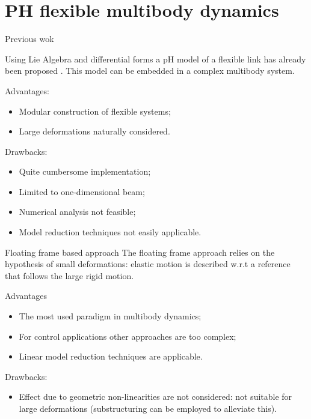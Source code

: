 \documentclass[aspectratio=169]{ISAE-Beamer}
\begin{document}
\section{PH flexible multibody dynamics}

\begin{frame}{Previous wok}

Using Lie Algebra and differential forms a pH model of a flexible link has already been proposed . This model can be embedded in a complex multibody system. \\

\begin{overlayarea}{\textwidth}{0.55\textheight}
	\setlength{\abovedisplayskip}{1pt}
	\setlength{\belowdisplayskip}{1pt}
	Advantages:
	\begin{itemize}
		\item {Modular construction of flexible systems;}
		\item {Large deformations naturally considered.}
	\end{itemize}
	Drawbacks:
	\begin{itemize}
		\item {Quite cumbersome implementation;}
		\item {Limited to one-dimensional beam;}
		\item {Numerical analysis not feasible;}
		\item {Model reduction techniques not easily applicable.} 
	\end{itemize}
\end{overlayarea}
\end{frame}

\begin{frame}{Floating frame based approach}
The floating frame approach relies on the hypothesis of small deformations: elastic motion is described w.r.t a reference that follows the large rigid motion. \\
\begin{overlayarea}{\textwidth}{0.5\textheight}
	Advantages 
	\begin{itemize}
		\item {The most used paradigm in multibody dynamics;}
		\item {For control applications other approaches are too complex;}
		\item {Linear model reduction techniques are applicable.} 
	\end{itemize}
	Drawbacks:
	\begin{itemize}
		\item {Effect due to geometric non-linearities are not considered: not suitable for large deformations (substructuring can be employed to alleviate this).}
	\end{itemize}
\end{overlayarea}
\end{frame}
\end{document}
